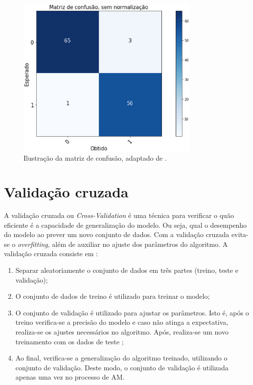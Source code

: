 \begin{figure}[!htb]
	\centering
	\includegraphics[width=0.8\textwidth]{figuras/matriz_consusao.eps}
	\caption{Ilustração da matriz de confusão, adaptado de .}
	\label{matriz_consusao}
\end{figure}

\section{Validação cruzada}
\label{sc:crossvalidation}
A validação cruzada ou \textit{Cross-Validation} é uma técnica para verificar o quão eficiente é a capacidade de generalização do modelo. Ou seja, qual o desempenho do modelo ao prever um novo conjunto de dados. Com a validação cruzada evita-se o \textit{overfitting}, além de auxiliar no ajuste dos parâmetros do algoritmo. A validação cruzada consiste em \cite{james2013introduction}:

\begin{enumerate}
    \item Separar aleatoriamente o conjunto de dados em três partes (treino, teste e validação);
    \item O conjunto de dados de treino é utilizado para treinar o modelo;
    \item O conjunto de validação é utilizado para ajustar os parâmetros. Isto é, após o treino verifica-se a precisão do modelo e caso não atinga a expectativa, realiza-se os ajustes necessários no algoritmo. Após, realiza-se um novo treinamento com os dados de teste \cite{raschka2015python};
    \item Ao final, verifica-se a generalização do algoritmo treinado, utilizando o conjunto de validação. Deste modo, o conjunto de validação é utilizada apenas uma vez no processo de AM.
\end{enumerate}

